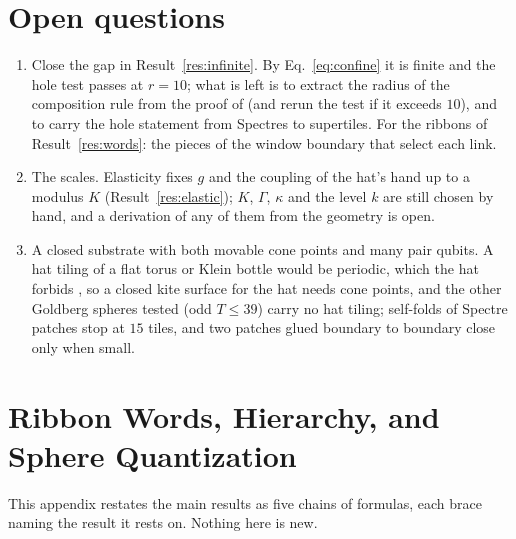\documentclass[11pt]{article}
\theoremstyle{definition}
\begin{document}
\section{Open questions}\label{app:open}
\begin{enumerate}[leftmargin=1.6em,itemsep=1pt]
\item Close the gap in Result~\ref{res:infinite}. By Eq.~\eqref{eq:confine} it is finite and the hole test passes at $r=10$; what is left is to extract the radius of the composition rule from the proof of \cite{smith2023} (and rerun the test if it exceeds $10$), and to carry the hole statement from Spectres to supertiles. For the ribbons of Result~\ref{res:words}: the pieces of the window boundary that select each link.
\item The scales. Elasticity fixes $g$ and the coupling of the hat's hand up to a modulus $K$ (Result~\ref{res:elastic}); $K$, $\Gamma$, $\kappa$ and the level $k$ are still chosen by hand, and a derivation of any of them from the geometry is open.
\item A closed substrate with both movable cone points and many pair qubits. A hat tiling of a flat torus or Klein bottle would be periodic, which the hat forbids \cite{smith2024hat}, so a closed kite surface for the hat needs cone points, and the other Goldberg spheres tested (odd $T\le39$) carry no hat tiling; self-folds of Spectre patches stop at $15$ tiles, and two patches glued boundary to boundary close only when small.
\end{enumerate}

\section{Ribbon Words, Hierarchy, and Sphere Quantization}
\label{app:fit}
This appendix restates the main results as five chains of formulas, each brace naming the result it rests on. Nothing here is new.
\end{document}
